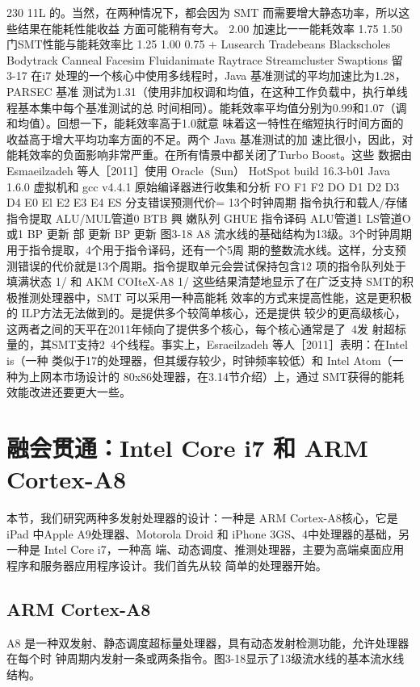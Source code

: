 230
11L
的。当然，在两种情况下，都会因为 SMT 而需要增大静态功率，所以这些结果在能耗性能收益
方面可能稍有夸大。
2.00
加速比一一能耗效率
1.75
1.50
门SMT性能与能耗效率比
1.25
1.00
0.75 +
Lusearch
Tradebeans
Blackscholes
Bodytrack
Canneal
Facesim
Fluidanimate
Raytrace
Streamcluster
Swaptions
留 3-17
在i7 处理的一个核心中使用多线程时，Java 基准测试的平均加速比为1.28，PARSEC 基准
测试为1.31（使用非加权调和均值，在这种工作负载中，执行单线程基本集中每个基准测试的总
时间相同）。能耗效率平均值分别为0.99和1.07（调和均值）。回想一下，能耗效率高于1.0就意
味着这一特性在缩短执行时间方面的收益高于增大平均功率方面的不足。两个 Java 基准测试的加
速比很小，因此，对能耗效率的负面影响非常严重。在所有情景中都关闭了Turbo Boost。这些
数据由 Esmaeilzadeh 等人［2011］使用 Oracle（Sun） HotSpot build 16.3-b01 Java 1.6.0 虚拟机和 gcc
v4.4.1 原始编译器进行收集和分析
FO
F1 F2 DO D1 D2 D3 D4 E0 El E2 E3 E4 ES
分支错误预测代价=
13个时钟周期
指令执行和载人/存储
指令提取
ALU/MUL管道0
BTB
興
嫩队列
GHUE
指令译码
ALU管道1
LS管道O或1
BP
更新
部
更新
BP
更新
图3-18 A8 流水线的基础结构为13级。3个时钟周期用于指令提取，4个用于指令译码，还有一个5周
期的整数流水线。这样，分支预测错误的代价就是13个周期。指令提取单元会尝试保持包含12
项的指令队列处于填满状态
1/ 和 AKM COIteX-A8
1/
这些结果清楚地显示了在广泛支持 SMT的积极推测处理器中，SMT 可以采用一种高能耗
效率的方式来提高性能，这是更积极的 ILP方法无法做到的。是提供多个较简单核心，还是提供
较少的更高级核心，这两者之间的天平在2011年倾向了提供多个核心，每个核心通常是了~4发
射超标量的，其SMT支持2~4个线程。事实上，Esraeilzadeh 等人［2011］表明：在Intel is（一种
类似于17的处理器，但其缓存较少，时钟频率较低）和 Intel Atom（一种为上网本市场设计的
80x86处理器，在3.14节介绍）上，通过 SMT获得的能耗效能改进还要更大一些。

\section{融会贯通：Intel Core i7 和 ARM Cortex-A8}
本节，我们研究两种多发射处理器的设计：一种是 ARM Cortex-A8核心，它是 iPad 中Apple
A9处理器、Motorola Droid 和 iPhone 3GS、4中处理器的基础，另一种是 Intel Core i7，一种高
端、动态调度、推测处理器，主要为高端桌面应用程序和服务器应用程序设计。我们首先从较
简单的处理器开始。

\subsection{ARM Cortex-A8}
A8 是一种双发射、静态调度超标量处理器，具有动态发射检测功能，允许处理器在每个时
钟周期内发射一条或两条指令。图3-18显示了13级流水线的基本流水线结构。

